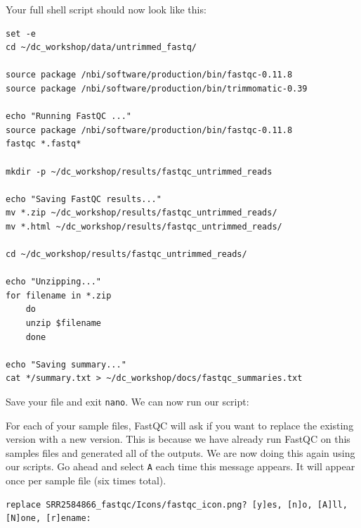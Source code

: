 \documentclass[
  letterpaper,
  DIV=11,
  numbers=noendperiod]{scrreprt}
\newenvironment{Shaded}{\begin{snugshade}}{\end{snugshade}}
\newcommand{\BuiltInTok}[1]{\textcolor[rgb]{0.00,0.23,0.31}{#1}}
\newcommand{\ExtensionTok}[1]{\textcolor[rgb]{0.00,0.23,0.31}{#1}}
\newcommand{\NormalTok}[1]{\textcolor[rgb]{0.00,0.23,0.31}{#1}}
\begin{document}
Your full shell script should now look like this:

\begin{verbatim}
set -e
cd ~/dc_workshop/data/untrimmed_fastq/

source package /nbi/software/production/bin/fastqc-0.11.8
source package /nbi/software/production/bin/trimmomatic-0.39

echo "Running FastQC ..."
source package /nbi/software/production/bin/fastqc-0.11.8
fastqc *.fastq*

mkdir -p ~/dc_workshop/results/fastqc_untrimmed_reads

echo "Saving FastQC results..."
mv *.zip ~/dc_workshop/results/fastqc_untrimmed_reads/
mv *.html ~/dc_workshop/results/fastqc_untrimmed_reads/

cd ~/dc_workshop/results/fastqc_untrimmed_reads/

echo "Unzipping..."
for filename in *.zip
    do
    unzip $filename
    done

echo "Saving summary..."
cat */summary.txt > ~/dc_workshop/docs/fastqc_summaries.txt
\end{verbatim}

Save your file and exit \texttt{nano}. We can now run our script:

\begin{Shaded}
\end{Shaded}

For each of your sample files, FastQC will ask if you want to replace
the existing version with a new version. This is because we have already
run FastQC on this samples files and generated all of the outputs. We
are now doing this again using our scripts. Go ahead and select
\texttt{A} each time this message appears. It will appear once per
sample file (six times total).

\begin{verbatim}
replace SRR2584866_fastqc/Icons/fastqc_icon.png? [y]es, [n]o, [A]ll, [N]one, [r]ename:
\end{verbatim}
\end{document}
